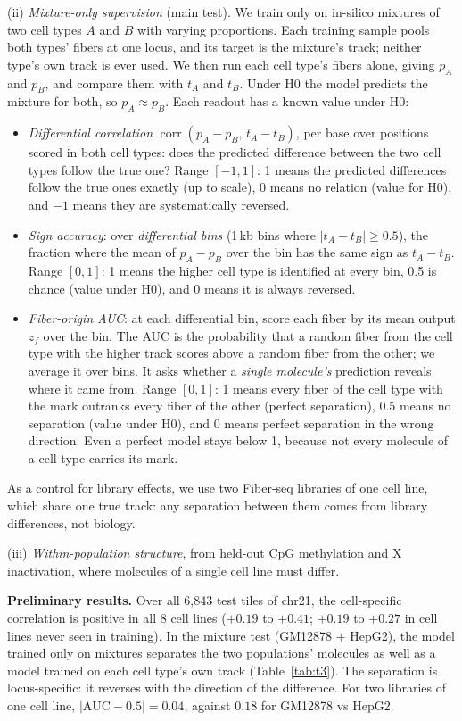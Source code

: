 \documentclass[acmtog]{acmart}
\begin{document}
(ii) \emph{Mixture-only supervision} (main test). We train only on in-silico mixtures of two cell types $A$ and $B$ with varying proportions. Each training sample pools both types' fibers at one locus, and its target is the mixture's track; neither type's own track is ever used. We then run each cell type's fibers alone, giving $p_A$ and $p_B$, and compare them with $t_A$ and $t_B$. Under H0 the model predicts the mixture for both, so $p_A\approx p_B$. Each readout has a known value under H0:
\begin{itemize}
  \item \emph{Differential correlation} $\operatorname{corr}(p_A-p_B,\,t_A-t_B)$, per base over positions scored in both cell types: does the predicted difference between the two cell types follow the true one? Range $[-1,1]$: 1 means the predicted differences follow the true ones exactly (up to scale), 0 means no relation (value for H0), and $-1$ means they are systematically reversed.
  \item \emph{Sign accuracy}: over \emph{differential bins} (1\,kb bins where $|t_A-t_B|\ge0.5$), the fraction where the mean of $p_A-p_B$ over the bin has the same sign as $t_A-t_B$. Range $[0,1]$: 1 means the higher cell type is identified at every bin, 0.5 is chance (value under H0), and 0 means it is always reversed.
  \item \emph{Fiber-origin AUC}: at each differential bin, score each fiber by its mean output $z_f$ over the bin. The AUC is the probability that a random fiber from the cell type with the higher track scores above a random fiber from the other; we average it over bins. It asks whether a \emph{single molecule's} prediction reveals where it came from. Range $[0,1]$: 1 means every fiber of the cell type with the mark outranks every fiber of the other (perfect separation), 0.5 means no separation (value under H0), and 0 means perfect separation in the wrong direction. Even a perfect model stays below 1, because not every molecule of a cell type carries its mark.
\end{itemize}
As a control for library effects, we use two Fiber-seq libraries of one cell line, which share one true track: any separation between them comes from library differences, not biology.

(iii) \emph{Within-population structure}, from held-out CpG methylation and X inactivation, where molecules of a single cell line must differ.

\textbf{Preliminary results.} Over all 6,843 test tiles of chr21, the cell-specific correlation is positive in all 8 cell lines ($+0.19$ to $+0.41$; $+0.19$ to $+0.27$ in cell lines never seen in training). In the mixture test (GM12878 + HepG2), the model trained only on mixtures separates the two populations' molecules as well as a model trained on each cell type's own track (Table~\ref{tab:t3}). The separation is locus-specific: it reverses with the direction of the difference. For two libraries of one cell line, $|\mathrm{AUC}-0.5|=0.04$, against $0.18$ for GM12878 vs HepG2.
\end{document}
